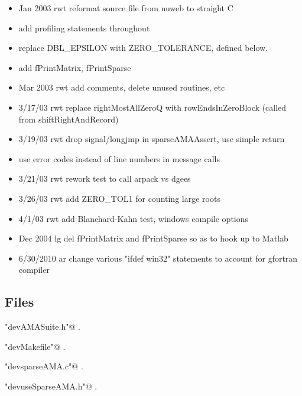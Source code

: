 \documentclass[12pt]{article}
\begin{document}
\begin{itemize}
\item  Jan 2003 	rwt reformat source file from nuweb to straight C
\item  add profiling statements throughout
\item replace DBL\_EPSILON with ZERO\_TOLERANCE, defined below.
\item   add fPrintMatrix, fPrintSparse      
\item  Mar 2003 	rwt add comments, delete unused routines, etc 
\item  3/17/03		rwt replace rightMostAllZeroQ with rowEndsInZeroBlock               (called from shiftRightAndRecord) 
\item  3/19/03     rwt drop signal/longjmp in sparseAMAAssert, use simple return  
\item  use error codes instead of line numbers in message calls   
\item  3/21/03		rwt rework test to call arpack vs dgees    
\item  3/26/03     rwt add ZERO\_TOL1 for counting large roots      
\item  4/1/03	 rwt add Blanchard-Kahn test, windows compile options  
\item  Dec 2004	lg	del fPrintMatrix and fPrintSparse so as to hook up to Matlab
\item  6/30/2010	ar 	change various "ifdef win32" statements to account for gfortran compiler 
\end{itemize}

\subsection{Files}
\label{sec:files}




{\small\begin{list}{}{\setlength{\itemsep}{-\parsep}\setlength{\itemindent}{-\leftmargin}}
\item \verb@"devAMASuite.h"@ {\footnotesize {\NWtxtDefBy} .}
\item \verb@"devMakefile"@ {\footnotesize {\NWtxtDefBy} .}
\item \verb@"devsparseAMA.c"@ {\footnotesize {\NWtxtDefBy} .
}
\item \verb@"devuseSparseAMA.h"@ {\footnotesize {\NWtxtDefBy} .}
\end{list}}
\end{document}
